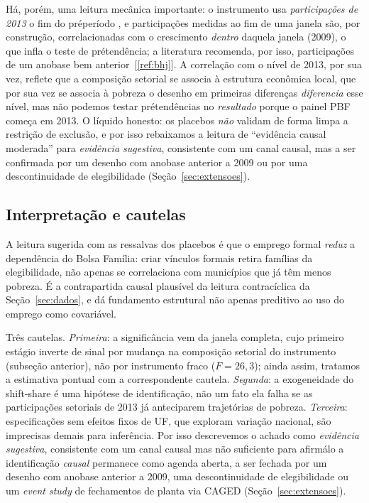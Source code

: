 \documentclass[12pt,a4paper,oneside]{article}
\newcommand{\C}[1]{[\ref{#1}]}
\begin{document}
Há, porém, uma leitura mecânica importante: o instrumento usa
\emph{participações de 2013} \textemdash{} o fim do pré\-período
\textemdash{}, e participações medidas ao fim de uma janela são, por
construção, correlacionadas com o crescimento \emph{dentro} daquela janela
(2009), o que infla o teste de pré\-tendência; a literatura
recomenda, por isso, participações de um ano\-base bem anterior~\C{ref:bhj}.
A correlação com o nível de 2013, por sua vez, reflete que a composição
setorial se associa à estrutura econômica local, que por sua vez se associa
à pobreza \textemdash{} o desenho em primeiras diferenças \emph{diferencia}
esse nível, mas não podemos testar pré\-tendências no \emph{resultado}
porque o painel PBF começa em 2013. O líquido honesto: os placebos
\emph{não} validam de forma limpa a restrição de exclusão, e por isso
rebaixamos a leitura de ``evidência causal moderada'' para \emph{evidência
sugestiva}, consistente com um canal causal, mas a ser confirmada por um
desenho com ano\-base anterior a 2009 ou por uma descontinuidade de
elegibilidade (Seção~\ref{sec:extensoes}).

\subsection{Interpretação e cautelas}

A leitura sugerida \textemdash{} com as ressalvas dos placebos \textemdash{}
é que o emprego formal \emph{reduz} a dependência do Bolsa Família: criar
vínculos formais retira famílias da elegibilidade, não apenas se correlaciona
com municípios que já têm menos pobreza. É a contrapartida causal plausível
da leitura contracíclica da Seção~\ref{sec:dados}, e dá fundamento
estrutural \textemdash{} não apenas preditivo \textemdash{} ao uso do emprego
como covariável.

Três cautelas. \emph{Primeira}: a significância vem da janela completa, cujo
primeiro estágio inverte de sinal por mudança na composição setorial do
instrumento (subseção anterior), não por instrumento fraco ($F=26{,}3$);
ainda assim, tratamos a estimativa pontual com a correspondente cautela.
\emph{Segunda}: a exogeneidade do shift-share é uma
hipótese de identificação, não um fato \textemdash{} ela falha se as
participações setoriais de 2013 já anteciparem trajetórias de pobreza.
\emph{Terceira}: especificações sem efeitos fixos de UF, que exploram
variação nacional, são imprecisas demais para inferência. Por isso
descrevemos o achado como \emph{evidência sugestiva}, consistente com um
canal causal mas não suficiente para afirmá\-lo \textemdash{} a
identificação \emph{causal} permanece como agenda aberta, a ser fechada por
um desenho com ano\-base anterior a 2009, uma descontinuidade de
elegibilidade ou um \emph{event study} de fechamentos de planta via CAGED
(Seção~\ref{sec:extensoes}).
\end{document}

